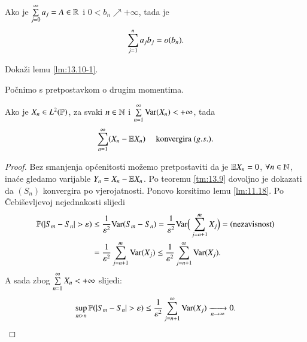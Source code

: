 \begin{lm}  \label{lm:13.10-1}
    Ako je $\sum\limits_{j = 0}^{\infty} a_j = A \in \mathbb{R}$ i $0 < b_n \nearrow +\infty$, tada je
    \begin{equation*}
        \sum\limits_{j = 1}^{n} a_j b_j = o(b_n).
    \end{equation*}
\end{lm}

\begin{zad} \label{zad:13.11}
    Doka\v zi lemu \ref{lm:13.10-1}.
\end{zad}

Po\v cnimo s pretpostavkom o drugim momentima.

\begin{tm}  \label{tm:13.12}
    Ako je $X_n \in L^2 (\mathbb{P})$, za svaki $n \in \mathbb{N}$ i $\sum\limits_{n = 1}^{\infty} \mathrm{Var} (X_n) < +\infty$, tada
    \begin{equation*}
        \sum\limits_{n = 1}^{\infty} (X_n - \mathbb{E} X_n) \quad \textnormal{ konvergira } (g.s.).
    \end{equation*}
\end{tm}

\begin{proof}
    Bez smanjenja op\' cenitosti mo\v zemo pretpostaviti da je $\mathbb{E} X_n = 0$, $\forall n \in \mathbb{N}$, ina\' ce gledamo varijable $Y_n = X_n - \mathbb{E} X_n$.
    Po teoremu \ref{tm:13.9} dovoljno je dokazati da $(S_n)$ konvergira po vjerojatnosti.
    Ponovo korsitimo lemu \ref{lm:11.18}.
    Po \v Cebi\v sevljevoj nejednakosti slijedi
    \begin{equation*}
        \begin{aligned}
            \mathbb{P}({|S_m - S_n| > \varepsilon}) &\leq \frac{1}{\varepsilon^2} \mathrm{Var} (S_m - S_n) = \frac{1}{\varepsilon^2} \mathrm{Var} \Big( \sum\limits_{j = n + 1}^{m} X_j \Big) = (\textnormal{nezavisnost})\\
            &= \frac{1}{\varepsilon^2} \sum\limits_{j = n + 1}^{m} \mathrm{Var} (X_j) \leq \frac{1}{\varepsilon^2} \sum\limits_{j = n + 1}^{\infty} \mathrm{Var} (X_j).
        \end{aligned}
    \end{equation*}
    A sada zbog $\sum\limits_{n = 1}^{\infty} X_n < +\infty$ slijedi:
    \begin{equation*}
        \sup\limits_{m > n} \mathbb{P}({|S_m - S_n| > \varepsilon}) \leq \frac{1}{\varepsilon^2} \sum\limits_{j = n + 1}^{\infty} \mathrm{Var} (X_j) \xrightarrow[n \to \infty]{} 0.
    \end{equation*}
\end{proof}